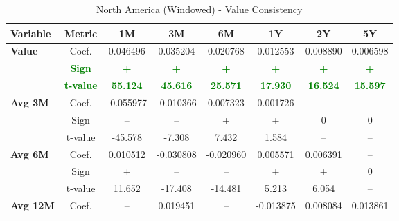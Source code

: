 \documentclass[11pt,english,a4paper,hidelinks]{book}
\begin{document}
\begin{table}[H]
    \centering
    \caption{North America (Windowed) - Value Consistency}
    \begin{tabular}{lccccccc}
        \toprule
        \textbf{Variable} & \textbf{Metric} & \textbf{1M} & \textbf{3M} & \textbf{6M} & \textbf{1Y} & \textbf{2Y} & \textbf{5Y} \\
        \midrule
        \multirow{3}{*}{\textbf{Value}}
            & Coef.   & 0.046496  & 0.035204  & 0.020768  & 0.012553  & 0.008890  & 0.006598  \\
            & \textbf{\textcolor{green}{Sign}}
                     & \textbf{\textcolor{green}{+}}
                     & \textbf{\textcolor{green}{+}}
                     & \textbf{\textcolor{green}{+}}
                     & \textbf{\textcolor{green}{+}}
                     & \textbf{\textcolor{green}{+}}
                     & \textbf{\textcolor{green}{+}} \\
            & \textbf{\textcolor{green}{t-value}}
                     & \textbf{\textcolor{green}{55.124}}
                     & \textbf{\textcolor{green}{45.616}}
                     & \textbf{\textcolor{green}{25.571}}
                     & \textbf{\textcolor{green}{17.930}}
                     & \textbf{\textcolor{green}{16.524}}
                     & \textbf{\textcolor{green}{15.597}} \\
        \cmidrule{1-8}
        \multirow{3}{*}{\textbf{Avg 3M}}
            & Coef.   & -0.055977 & -0.010366 & 0.007323  & 0.001726  & --        & --        \\
            & Sign    & –         & –         & +         & +         & 0         & 0         \\
            & t-value & -45.578   & -7.308    & 7.432     & 1.584     & --        & --        \\
        \cmidrule{1-8}
        \multirow{3}{*}{\textbf{Avg 6M}}
            & Coef.   & 0.010512  & -0.030808 & -0.020960 & 0.005571  & 0.006391  & --        \\
            & Sign    & +         & –         & –         & +         & +         & 0         \\
            & t-value & 11.652    & -17.408   & -14.481   & 5.213     & 6.054     & --        \\
        \cmidrule{1-8}
        \multirow{3}{*}{\textbf{Avg 12M}}
            & Coef.   & --        & 0.019451  & --        & -0.013875 & 0.008084  & 0.013861  \\

\end{tabular}
\end{table}
\end{document}
